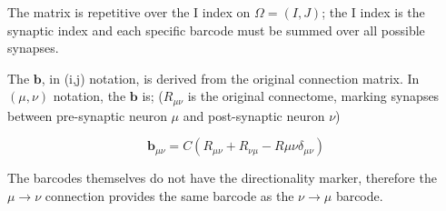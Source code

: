 \documentclass[%
 reprint,
 amsmath,amssymb,
 aps,
]{revtex4-1}
\begin{document}
The matrix is repetitive over the I index on $\Omega = (I,J)$; the I index is the synaptic index and each specific barcode must be summed over all possible synapses. 

The $\mathbf{b}$, in (i,j) notation, is derived from the original connection matrix. In $(\mu,\nu)$ notation, the $\mathbf{b}$ is; ($R_{\mu\nu}$ is the original connectome, marking synapses between pre-synaptic neuron $\mu$ and post-synaptic neuron $\nu$)

\begin{equation}
	\mathbf{b}_{\mu\nu} = C\left( R_{\mu\nu} + R_{\nu\mu} - R{\mu\nu}\delta_{\mu\nu} \right)
\end{equation}

The barcodes themselves do not have the directionality marker, therefore the $\mu \rightarrow \nu$
connection provides the same barcode as the $\nu \rightarrow \mu$ barcode.







\end{document}
